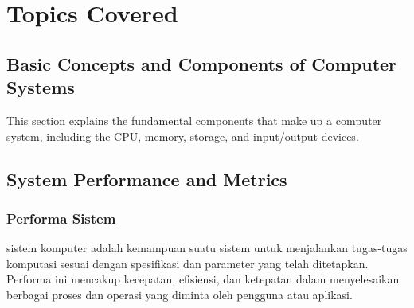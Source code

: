 \documentclass[12pt]{article}
\begin{document}
\section{Topics Covered}

\subsection{Basic Concepts and Components of Computer Systems}
This section explains the fundamental components that make up a computer system, including the CPU, memory, storage, and input/output devices.

\subsection{System Performance and Metrics}
\subsubsection{Performa Sistem}
    \Performa sistem komputer adalah kemampuan suatu sistem untuk menjalankan tugas-tugas komputasi sesuai dengan spesifikasi dan parameter yang telah ditetapkan. Performa ini mencakup kecepatan, efisiensi, dan ketepatan dalam menyelesaikan berbagai proses dan operasi yang diminta oleh pengguna atau aplikasi.
\end{document}
